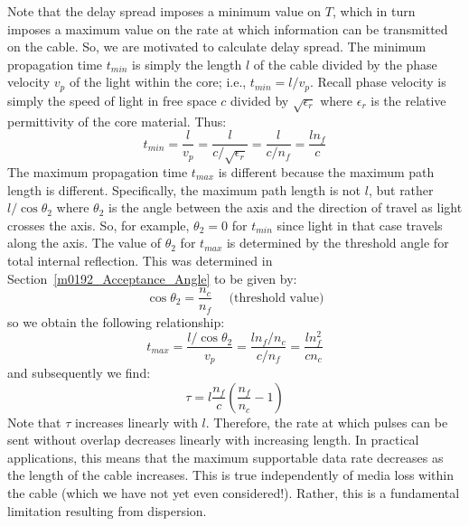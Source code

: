 Note that the delay spread imposes a minimum value on $T$, which in turn imposes a maximum value on the rate at which information can be transmitted on the cable.
So, we are motivated to calculate delay spread.
The minimum propagation time $t_{min}$ is simply the length $l$ of the cable divided by the phase velocity $v_p$ of the light within the core; 
i.e., $t_{min} = l/v_p$.  
Recall phase velocity is simply the speed of light in free space $c$ divided by $\sqrt{\epsilon_r}$ where $\epsilon_r$ is the relative permittivity of the core material.
Thus:
%
\begin{equation}
t_{min} = \frac{l}{v_p} = \frac{l}{c/\sqrt{\epsilon_r}} = \frac{l}{c/n_f} = \frac{l n_f}{c}
\end{equation}
%
The maximum propagation time $t_{max}$ is different because the maximum path length is different. 
Specifically, the maximum path length is not $l$, but rather $l/\cos\theta_2$ where $\theta_2$ is the angle between the axis and the direction of travel as light crosses the axis.
So, for example, $\theta_2=0$ for $t_{min}$ since light in that case travels along the axis.
The value of $\theta_2$ for $t_{max}$ is determined by the threshold angle for total internal reflection.
This was determined in Section~\ref{m0192_Acceptance_Angle} to be given by:
%
\begin{equation}
\cos\theta_2 = \frac{n_c}{n_f} ~~~~~~\mbox{(threshold value)}
\end{equation}
%
so we obtain the following relationship:
%
\begin{equation}
t_{max} = \frac{l/\cos\theta_2}{v_p} = \frac{l n_f/n_c}{c/n_f} = \frac{l n_f^2}{c n_c}
\end{equation}
%
and subsequently we find:
%
\begin{equation}
\boxed{
\tau = l \frac{n_f}{c} \left( \frac{n_f}{n_c} - 1 \right)
}
\label{m0193_eDS}
\end{equation}
%
Note that $\tau$ increases linearly with $l$.
Therefore, the rate at which pulses can be sent without overlap decreases linearly with increasing length.
In practical applications, this means that the maximum supportable data rate decreases as the length of the cable increases.
This is true independently of media loss within the cable (which we have not yet even considered!).
Rather, this is a fundamental limitation resulting from dispersion.

